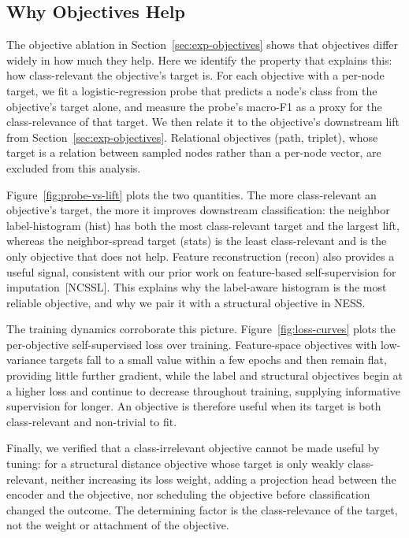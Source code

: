 \subsection{Why Objectives Help}
\label{sec:exp-why}

The objective ablation in Section~\ref{sec:exp-objectives} shows that objectives differ widely in how much they help. Here we identify the property that explains this: how class-relevant the objective's target is. For each objective with a per-node target, we fit a logistic-regression probe that predicts a node's class from the objective's target alone, and measure the probe's macro-F1 as a proxy for the class-relevance of that target. We then relate it to the objective's downstream lift from Section~\ref{sec:exp-objectives}. Relational objectives (path, triplet), whose target is a relation between sampled nodes rather than a per-node vector, are excluded from this analysis.

Figure~\ref{fig:probe-vs-lift} plots the two quantities. The more class-relevant an objective's target, the more it improves downstream classification: the neighbor label-histogram (hist) has both the most class-relevant target and the largest lift, whereas the neighbor-spread target (stats) is the least class-relevant and is the only objective that does not help. Feature reconstruction (recon) also provides a useful signal, consistent with our prior work on feature-based self-supervision for imputation~[NCSSL]. This explains why the label-aware histogram is the most reliable objective, and why we pair it with a structural objective in NESS.

The training dynamics corroborate this picture. Figure~\ref{fig:loss-curves} plots the per-objective self-supervised loss over training. Feature-space objectives with low-variance targets fall to a small value within a few epochs and then remain flat, providing little further gradient, while the label and structural objectives begin at a higher loss and continue to decrease throughout training, supplying informative supervision for longer. An objective is therefore useful when its target is both class-relevant and non-trivial to fit.

Finally, we verified that a class-irrelevant objective cannot be made useful by tuning: for a structural distance objective whose target is only weakly class-relevant, neither increasing its loss weight, adding a projection head between the encoder and the objective, nor scheduling the objective before classification changed the outcome. The determining factor is the class-relevance of the target, not the weight or attachment of the objective.

